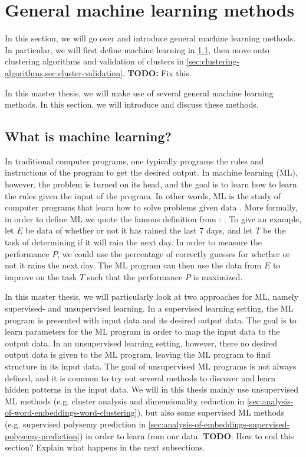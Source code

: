 \section{General machine learning methods}
In this section, we will go over and introduce general machine learning methods. In particular, we will first define machine learning in \cref{sec:what-is-machine-learning}, then move onto clustering algorithms and validation of clusters in \cref{sec:clustering-algorithms,sec:cluster-validation}. \textbf{TODO:} Fix this.

In this master thesis, we will make use of several general machine learning methods. In this section, we will introduce and discuss these methods.

\subsection{What is machine learning?}
\label{sec:what-is-machine-learning}
In traditional computer programs, one typically programs the rules and instructions of the program to get the desired output. In machine learning (ML), however, the problem is turned on its head, and the goal is to learn how to learn the rules given the input of the program. In other words, ML is the study of computer programs that learn how to solve problems given data \cite{Mitchell1997}. More formally, in order to define ML we quote the famous definition from \cite[p. 2]{Mitchell1997}: . To give an example, let $E$ be data of whether or not it has rained the last 7 days, and let $T$ be the task of determining if it will rain the next day. In order to measure the performance $P$, we could use the percentage of correctly guesses for whether or not it rains the next day. The ML program can then use the data from $E$ to improve on the task $T$ such that the performance $P$ is maximized.

In this master thesis, we will particularly look at two approaches for ML, namely supervised- and unsupervised learning. In a supervised learning setting, the ML program is presented with input data and its desired output data. The goal is to learn parameters for the ML program in order to map the input data to the output data. In an unsupervised learning setting, however, there no desired output data is given to the ML program, leaving the ML program to find structure in its input data. The goal of unsupervised ML programs is not always defined, and it is common to try out several methods to discover and learn hidden patterns in the input data. We will in this thesis mainly use unsupervised ML methods (e.g. cluster analysis and dimensionality reduction in \cref{sec:analysis-of-word-embeddings-word-clustering}), but also some supervised ML methods (e.g. supervised polysemy prediction in \cref{sec:analysis-of-embeddings-supervised-polysemy-prediction}) in order to learn from our data. \textbf{TODO}: How to end this section? Explain what happens in the next subsections.

